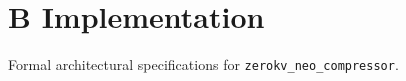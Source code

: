 \section{B Implementation}

Formal architectural specifications for \texttt{zerokv_neo_compressor}.

